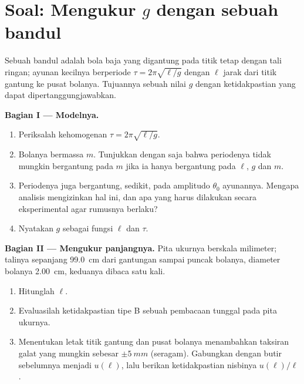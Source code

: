 \section{Soal: Mengukur $g$ dengan sebuah bandul}

\begin{problem}
\label{pb:b1:units-dimensions:1}
Sebuah bandul adalah bola baja yang digantung pada titik tetap dengan
tali ringan; ayunan kecilnya berperiode $\tau = 2\pi\sqrt{\ell/g}$
dengan $\ell$ jarak dari titik gantung ke pusat bolanya. Tujuannya
sebuah nilai $g$ dengan ketidakpastian yang dapat dipertanggungjawabkan.

\medskip
\noindent\textbf{Bagian I --- Modelnya.}
\begin{enumerate}
  \item Periksalah kehomogenan $\tau = 2\pi\sqrt{\ell/g}$.
  \item Bolanya bermassa $m$. Tunjukkan dengan  saja bahwa
        periodenya tidak mungkin bergantung pada $m$ jika ia hanya
        bergantung pada $\ell$, $g$ dan $m$.
  \item Periodenya juga bergantung, sedikit, pada amplitudo $\theta_0$
        ayunannya. Mengapa analisis  mengizinkan hal ini, dan apa
        yang harus dilakukan secara eksperimental agar rumusnya berlaku?
  \item Nyatakan $g$ sebagai fungsi $\ell$ dan $\tau$.
\end{enumerate}

\medskip
\noindent\textbf{Bagian II --- Mengukur panjangnya.}
Pita ukurnya berskala milimeter; talinya sepanjang
\qty{99.0}{cm} dari gantungan sampai puncak bolanya, diameter bolanya
\qty{2.00}{cm}, keduanya dibaca satu kali.
\begin{enumerate}[resume]
  \item Hitunglah $\ell$.
  \item Evaluasilah ketidakpastian tipe B sebuah pembacaan tunggal pada
        pita ukurnya.
  \item Menentukan letak titik gantung dan pusat bolanya menambahkan
        taksiran galat yang mungkin sebesar $\pm\qty{5}{mm}$ (seragam).
        Gabungkan dengan butir sebelumnya menjadi $u(\ell)$, lalu
        berikan ketidakpastian nisbinya $u(\ell)/\ell$.
\end{enumerate}


\end{problem}
